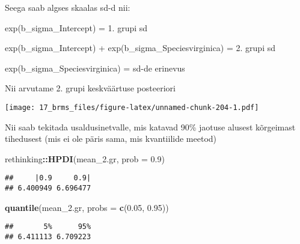 \documentclass[]{article}
\newenvironment{Shaded}{\begin{snugshade}}{\end{snugshade}}
\newcommand{\KeywordTok}[1]{\textcolor[rgb]{0.13,0.29,0.53}{\textbf{#1}}}
\newcommand{\DataTypeTok}[1]{\textcolor[rgb]{0.13,0.29,0.53}{#1}}
\newcommand{\FloatTok}[1]{\textcolor[rgb]{0.00,0.00,0.81}{#1}}
\newcommand{\StringTok}[1]{\textcolor[rgb]{0.31,0.60,0.02}{#1}}
\newcommand{\OtherTok}[1]{\textcolor[rgb]{0.56,0.35,0.01}{#1}}
\newcommand{\OperatorTok}[1]{\textcolor[rgb]{0.81,0.36,0.00}{\textbf{#1}}}
\newcommand{\NormalTok}[1]{#1}
\begin{document}
Seega saab algses skaalas sd-d nii:

exp(b\_sigma\_Intercept) = 1. grupi sd

exp(b\_sigma\_Intercept) + exp(b\_sigma\_Speciesvirginica) = 2. grupi sd

exp(b\_sigma\_Speciesvirginica) = sd-de erinevus

Nii arvutame 2. grupi keskväärtuse posteeriori

\begin{Shaded}
\end{Shaded}

\texttt{[image: 17\_brms\_files/figure-latex/unnamed-chunk-204-1.pdf]}

Nii saab tekitada usaldusinetvalle, mis katavad 90\% jaotuse alusest
kõrgeimast tihedusest (mis ei ole päris sama, mis kvantiilide meetod)

\begin{Shaded}
\begin{Highlighting}[]
\NormalTok{rethinking}\OperatorTok{::}\KeywordTok{HPDI}\NormalTok{(mean_}\FloatTok{2.}\NormalTok{gr, }\DataTypeTok{prob =} \FloatTok{0.9}\NormalTok{)}
\end{Highlighting}
\end{Shaded}

\begin{verbatim}
##     |0.9     0.9| 
## 6.400949 6.696477
\end{verbatim}

\begin{Shaded}
\begin{Highlighting}[]
\KeywordTok{quantile}\NormalTok{(mean_}\FloatTok{2.}\NormalTok{gr, }\DataTypeTok{probs =} \KeywordTok{c}\NormalTok{(}\FloatTok{0.05}\NormalTok{, }\FloatTok{0.95}\NormalTok{))}
\end{Highlighting}
\end{Shaded}

\begin{verbatim}
##       5%      95% 
## 6.411113 6.709223
\end{verbatim}
\end{document}

